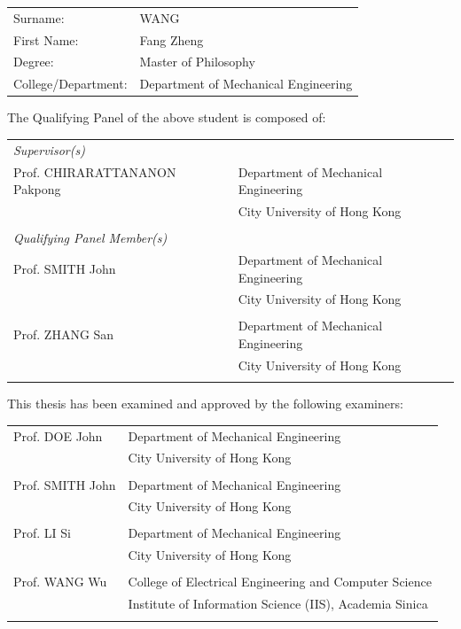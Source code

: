 
\begin{panel}

\begin{tabular}{p{50mm}p{70mm}}
Surname: & WANG\tabularnewline
First Name: & Fang Zheng\tabularnewline
Degree: & Master of Philosophy\tabularnewline
College/Department: & Department of Mechanical Engineering
\end{tabular}

\vspace{2em}

The Qualifying Panel of the above student is composed of:

\vspace{1em}

\begin{tabular}{p{50mm}p{90mm}}
\textit{Supervisor(s)} & \tabularnewline
Prof. CHIRARATTANANON Pakpong 	 & Department of Mechanical Engineering\tabularnewline
 & City University of Hong Kong\\[1em]\tabularnewline

 
\textit{Qualifying Panel Member(s)} & \tabularnewline
Prof. SMITH John 	 & Department of Mechanical Engineering\tabularnewline
 & City University of Hong Kong\\[.2em]\tabularnewline

Prof. ZHANG San 	 & Department of Mechanical Engineering\tabularnewline
 & City University of Hong Kong\\[.2em]\tabularnewline
\end{tabular}

\vspace{2em}

This thesis has been examined and approved by the following examiners:
\vspace{1em}

\begin{tabular}{p{50mm}p{90mm}}
Prof. DOE John 	 & Department of Mechanical Engineering\tabularnewline
 & City University of Hong Kong\\[.2em]\tabularnewline

Prof. SMITH John 	 & Department of Mechanical Engineering\tabularnewline
 & City University of Hong Kong\\[.2em]\tabularnewline

Prof. LI Si  & Department of Mechanical Engineering\tabularnewline
 & City University of Hong Kong\\[.2em]\tabularnewline

Prof. WANG Wu  & College of Electrical Engineering and Computer Science\tabularnewline
 & Institute of Information Science (IIS), Academia Sinica \\[.2em]\tabularnewline
\end{tabular}

\end{panel}
